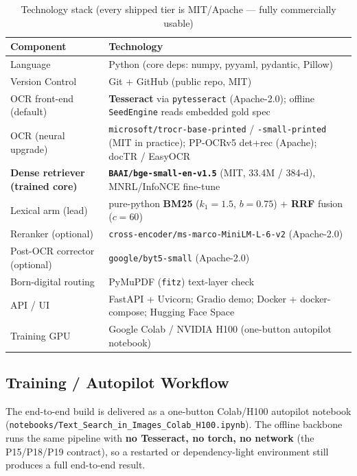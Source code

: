 \documentclass[12pt,a4paper]{article}
\begin{document}
\begin{table}[H]
\centering
\caption{Technology stack (every shipped tier is MIT/Apache --- fully commercially usable)}
\small
\begin{tabularx}{\linewidth}{@{} l L @{}}
\toprule
\textbf{Component} & \textbf{Technology} \\
\midrule
Language & Python (core deps: numpy, pyyaml, pydantic, Pillow) \\
Version Control & Git + GitHub (public repo, MIT) \\
OCR front-end (default) & \textbf{Tesseract} via \texttt{pytesseract} (Apache-2.0); offline \texttt{SeedEngine} reads embedded gold spec \\
OCR (neural upgrade) & \texttt{microsoft/trocr-base-printed} / \texttt{-small-printed} (MIT in practice); PP-OCRv5 det+rec (Apache); docTR / EasyOCR \\
\textbf{Dense retriever (trained core)} & \textbf{\texttt{BAAI/bge-small-en-v1.5}} (MIT, 33.4M / 384-d), MNRL/InfoNCE fine-tune \\
Lexical arm (lead) & pure-python \textbf{BM25} ($k_1{=}1.5$, $b{=}0.75$) + \textbf{RRF} fusion ($c{=}60$) \\
Reranker (optional) & \texttt{cross-encoder/ms-marco-MiniLM-L-6-v2} (Apache-2.0) \\
Post-OCR corrector (optional) & \texttt{google/byt5-small} (Apache-2.0) \\
Born-digital routing & PyMuPDF (\texttt{fitz}) text-layer check \\
API / UI & FastAPI + Uvicorn; Gradio demo; Docker + docker-compose; Hugging Face Space \\
Training GPU & Google Colab / NVIDIA H100 (one-button autopilot notebook) \\
\bottomrule
\end{tabularx}
\end{table}

\subsection{Training / Autopilot Workflow}
\label{subsec:workflow}

The end-to-end build is delivered as a one-button Colab/H100 autopilot notebook (\texttt{notebooks/Text\_Search\_in\_Images\_Colab\_H100.ipynb}). The offline backbone runs the same pipeline with \textbf{no Tesseract, no torch, no network} (the P15/P18/P19 contract), so a restarted or dependency-light environment still produces a full end-to-end result.
\end{document}

